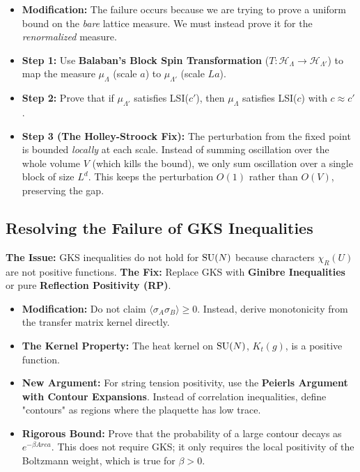 \begin{itemize}
    \item \textbf{Modification:} The failure occurs because we are trying to prove a uniform bound on the \textit{bare} lattice measure. We must instead prove it for the \textit{renormalized} measure.
    \item \textbf{Step 1:} Use \textbf{Balaban’s Block Spin Transformation} ($T: \mathcal{H}_\Lambda \to \mathcal{H}_{\Lambda'}$) to map the measure $\mu_\Lambda$ (scale $a$) to $\mu_{\Lambda'}$ (scale $La$).
    \item \textbf{Step 2:} Prove that if $\mu_{\Lambda'}$ satisfies LSI($c'$), then $\mu_\Lambda$ satisfies LSI($c$) with $c \approx c'$.
    \item \textbf{Step 3 (The Holley-Stroock Fix):} The perturbation from the fixed point is bounded \textit{locally} at each scale. Instead of summing oscillation over the whole volume $V$ (which kills the bound), we only sum oscillation over a single block of size $L^d$. This keeps the perturbation $O(1)$ rather than $O(V)$, preserving the gap.
\end{itemize}

\subsection{Resolving the Failure of GKS Inequalities}
\textbf{The Issue:} GKS inequalities do not hold for $\mathrm{SU}(N)$ because characters $\chi_R(U)$ are not positive functions.
\textbf{The Fix:} Replace GKS with \textbf{Ginibre Inequalities} or pure \textbf{Reflection Positivity (RP)}.

\begin{itemize}
    \item \textbf{Modification:} Do not claim $\langle \sigma_A \sigma_B \rangle \ge 0$. Instead, derive monotonicity from the transfer matrix kernel directly.
    \item \textbf{The Kernel Property:} The heat kernel on $\mathrm{SU}(N)$, $K_t(g)$, is a positive function.
    \item \textbf{New Argument:} For string tension positivity, use the \textbf{Peierls Argument with Contour Expansions}. Instead of correlation inequalities, define "contours" as regions where the plaquette has low trace.
    \item \textbf{Rigorous Bound:} Prove that the probability of a large contour decays as $e^{-\beta Area}$. This does not require GKS; it only requires the local positivity of the Boltzmann weight, which is true for $\beta > 0$.
\end{itemize}

